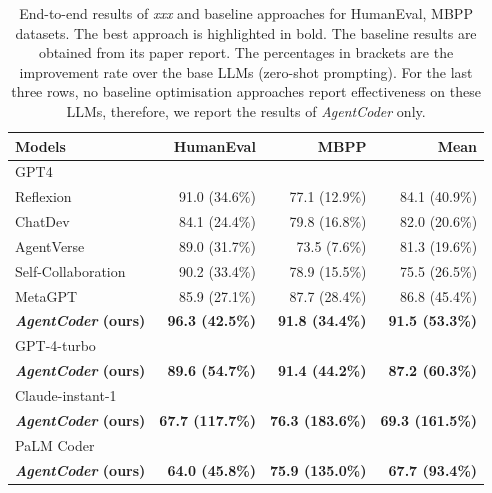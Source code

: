 \documentclass[manuscript,screen,review]{acmart}
\newcommand{\xxx}{AgentCoder\xspace}
\begin{document}
\begin{table}
    \centering
    \caption{End-to-end results of \textit{xxx} and baseline approaches for HumanEval, MBPP datasets. The best approach is highlighted in bold. The baseline results are obtained from its paper report. The percentages in brackets are the improvement rate over the base LLMs (zero-shot prompting). For the last three rows, no baseline optimisation approaches report effectiveness on these LLMs, therefore, we report the results of \textit{\xxx} only. }
    \begin{tabular}{l|rr|r}
    \toprule
    Models & \textbf{HumanEval} & \textbf{MBPP} & \textbf{Mean} \\
    \midrule
    \multicolumn{4}{l}{GPT4} \\
    \midrule
    Reflexion & 91.0 (34.6\%) & 77.1 (12.9\%) & 84.1 (40.9\%) \\
    ChatDev&84.1 (24.4\%)&79.8 (16.8\%)&82.0 (20.6\%)\\
    AgentVerse&89.0 (31.7\%)&73.5 (7.6\%)&81.3 (19.6\%)\\
    Self-Collaboration & 90.2 (33.4\%) & 78.9 (15.5\%) & 75.5 (26.5\%) \\
    MetaGPT & 85.9 (27.1\%) & 87.7 (28.4\%) & 86.8 (45.4\%) \\
    \textbf{\textit{\xxx} (ours)} & \cellcolor[rgb]{0.9,0.9,0.9} \textbf{96.3 (42.5\%)} & \cellcolor[rgb]{0.9,0.9,0.9} \textbf{91.8 (34.4\%)} & \cellcolor[rgb]{0.9,0.9,0.9} \textbf{91.5 (53.3\%)} \\
    \midrule
    \multicolumn{4}{l}{GPT-4-turbo} \\
    \midrule
    \textbf{\textit{\xxx} (ours)}&\cellcolor[rgb]{0.9,0.9,0.9}\textbf{89.6 (54.7\%)}&\cellcolor[rgb]{0.9,0.9,0.9}\textbf{91.4 (44.2\%)}&\cellcolor[rgb]{0.9,0.9,0.9}\textbf{87.2 (60.3\%)}\\
    \midrule
    \multicolumn{4}{l}{Claude-instant-1} \\
    \midrule
    \textbf{\textit{\xxx} (ours)}&\cellcolor[rgb]{0.9,0.9,0.9}\textbf{67.7 (117.7\%)}&\cellcolor[rgb]{0.9,0.9,0.9}\textbf{76.3 (183.6\%)}&\cellcolor[rgb]{0.9,0.9,0.9}\textbf{69.3 (161.5\%)}\\
    \midrule
    \multicolumn{4}{l}{PaLM Coder} \\
    \midrule
    \textbf{\textit{\xxx} (ours)}&\cellcolor[rgb]{0.9,0.9,0.9} \textbf{64.0 (45.8\%)}&\cellcolor[rgb]{0.9,0.9,0.9}\textbf{75.9 (135.0\%)}&\cellcolor[rgb]{0.9,0.9,0.9}\textbf{67.7 (93.4\%)}\\
    \bottomrule
    \end{tabular}
    \label{tab:end2endgpt4}
\end{table}
\end{document}
